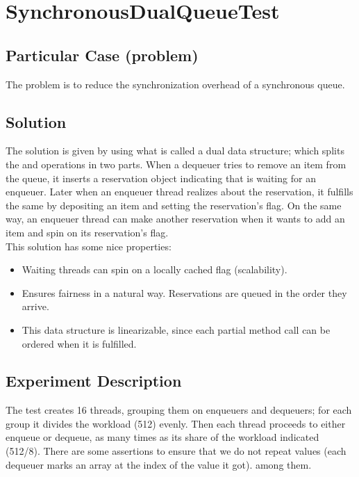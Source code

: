 \section{\textbf{SynchronousDualQueueTest}}

\subsection{Particular Case (problem)}
The problem is to reduce the synchronization overhead of a synchronous
queue.

\subsection{Solution}
The solution is given by using what is called a dual data structure;
which splits the  and  operations in two parts.  
When a dequeuer tries to
remove an item from the queue, it inserts a reservation object
indicating that is waiting for an enqueuer. Later when an enqueuer
thread realizes about the reservation, it fulfills the same by
depositing an item and setting the reservation's flag. On the same
way, an enqueuer thread can make another reservation when it wants to
add an item and spin on its reservation's flag. \\

This solution has some nice properties: 

\begin{itemize}
  \item Waiting threads can spin on a locally cached flag
    (scalability).
  \item Ensures fairness in a natural way. Reservations are queued in
    the order they arrive.
  \item This data structure is linearizable, since each partial method
    call can be ordered when it is fulfilled.
\end{itemize}

\subsection{Experiment Description}
The test creates 16 threads, grouping them on enqueuers and dequeuers;
for each group it divides the workload (512) evenly. Then each thread
proceeds to either enqueue or dequeue, as many times as its share of
the workload indicated (512/8). There are some assertions to ensure
that we do not repeat values (each dequeuer marks an array at the
index of the value it got). 
among them. 

